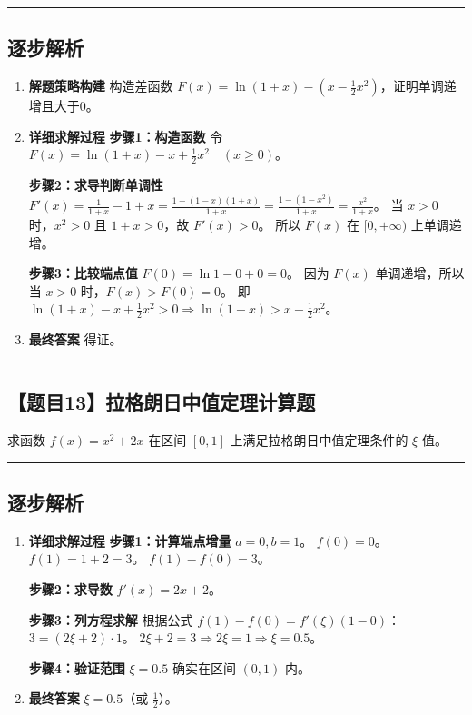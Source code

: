 \documentclass[UTF8]{ctexart}
\newenvironment{redenv}{\color{red}}{}
\newenvironment{detailedanalysis}{%
    \color{red}
    \begin{enumerate}[label=\textbf{第\arabic*步：}, leftmargin=*, align=left, itemsep=1.5ex]
}{%
    \end{enumerate}
}
\newcommand{\problemrule}{\noindent\rule{\textwidth}{1.5pt}\vspace{-0.8em}}
\newcommand{\analysisrule}{\noindent\rule{\textwidth}{0.8pt}\vspace{-0.8em}}
\begin{document}
\begin{redenv}
\analysisrule
\subsection*{逐步解析}

\begin{detailedanalysis}
\item \textbf{解题策略构建}
构造差函数 $F(x) = \ln(1+x) - (x - \frac{1}{2}x^2)$，证明单调递增且大于0。

\item \textbf{详细求解过程}
\noindent\textbf{步骤1：构造函数}
令 $F(x) = \ln(1+x) - x + \frac{1}{2}x^2 \quad (x \ge 0)$。

\noindent\textbf{步骤2：求导判断单调性}
$F'(x) = \frac{1}{1+x} - 1 + x = \frac{1 - (1-x)(1+x)}{1+x} = \frac{1 - (1-x^2)}{1+x} = \frac{x^2}{1+x}$。
当 $x > 0$ 时，$x^2 > 0$ 且 $1+x > 0$，故 $F'(x) > 0$。
所以 $F(x)$ 在 $[0, +\infty)$ 上单调递增。

\noindent\textbf{步骤3：比较端点值}
$F(0) = \ln 1 - 0 + 0 = 0$。
因为 $F(x)$ 单调递增，所以当 $x > 0$ 时，$F(x) > F(0) = 0$。
即 $\ln(1+x) - x + \frac{1}{2}x^2 > 0 \Rightarrow \ln(1+x) > x - \frac{1}{2}x^2$。

\item \textbf{最终答案}
得证。
\end{detailedanalysis}
\end{redenv}

\vspace{2em}
\problemrule
\subsection*{【题目13】拉格朗日中值定理计算题}
求函数 $f(x) = x^2 + 2x$ 在区间 $[0, 1]$ 上满足拉格朗日中值定理条件的 $\xi$ 值。

\begin{redenv}
\analysisrule
\subsection*{逐步解析}

\begin{detailedanalysis}
\item \textbf{详细求解过程}
\noindent\textbf{步骤1：计算端点增量}
$a=0, b=1$。
$f(0) = 0$。
$f(1) = 1 + 2 = 3$。
$f(1) - f(0) = 3$。

\noindent\textbf{步骤2：求导数}
$f'(x) = 2x + 2$。

\noindent\textbf{步骤3：列方程求解}
根据公式 $f(1) - f(0) = f'(\xi)(1 - 0)$：
$3 = (2\xi + 2) \cdot 1$。
$2\xi + 2 = 3 \Rightarrow 2\xi = 1 \Rightarrow \xi = 0.5$。

\noindent\textbf{步骤4：验证范围}
$\xi = 0.5$ 确实在区间 $(0, 1)$ 内。

\item \textbf{最终答案}
$\xi = 0.5$（或 $\frac{1}{2}$）。
\end{detailedanalysis}
\end{redenv}
\end{document}
